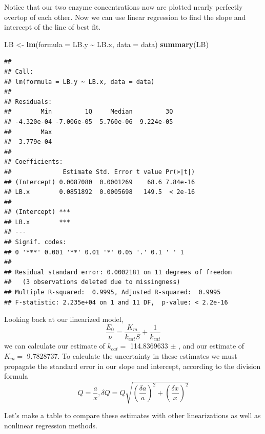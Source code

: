 \documentclass[
]{article}
\newenvironment{Shaded}{\begin{snugshade}}{\end{snugshade}}
\newcommand{\AttributeTok}[1]{\textcolor[rgb]{0.13,0.29,0.53}{#1}}
\newcommand{\FunctionTok}[1]{\textcolor[rgb]{0.13,0.29,0.53}{\textbf{#1}}}
\newcommand{\NormalTok}[1]{#1}
\newcommand{\OtherTok}[1]{\textcolor[rgb]{0.56,0.35,0.01}{#1}}
\newcommand{\SpecialCharTok}[1]{\textcolor[rgb]{0.81,0.36,0.00}{\textbf{#1}}}
\begin{document}
Notice that our two enzyme concentrations now are plotted nearly perfectly overtop of each other. Now we can use linear regression to find the slope and intercept of the line of best fit.

\begin{Shaded}
\begin{Highlighting}[]
\NormalTok{LB }\OtherTok{\textless{}{-}} \FunctionTok{lm}\NormalTok{(}\AttributeTok{formula =}\NormalTok{ LB.y }\SpecialCharTok{\textasciitilde{}}\NormalTok{ LB.x, }\AttributeTok{data =}\NormalTok{ data)}
\FunctionTok{summary}\NormalTok{(LB)}
\end{Highlighting}
\end{Shaded}

\begin{verbatim}
## 
## Call:
## lm(formula = LB.y ~ LB.x, data = data)
## 
## Residuals:
##        Min         1Q     Median         3Q 
## -4.320e-04 -7.006e-05  5.760e-06  9.224e-05 
##        Max 
##  3.779e-04 
## 
## Coefficients:
##              Estimate Std. Error t value Pr(>|t|)
## (Intercept) 0.0087080  0.0001269    68.6 7.84e-16
## LB.x        0.0851892  0.0005698   149.5  < 2e-16
##                
## (Intercept) ***
## LB.x        ***
## ---
## Signif. codes:  
## 0 '***' 0.001 '**' 0.01 '*' 0.05 '.' 0.1 ' ' 1
## 
## Residual standard error: 0.0002181 on 11 degrees of freedom
##   (3 observations deleted due to missingness)
## Multiple R-squared:  0.9995, Adjusted R-squared:  0.9995 
## F-statistic: 2.235e+04 on 1 and 11 DF,  p-value: < 2.2e-16
\end{verbatim}

Looking back at our linearized model,
\[\frac{E_0}{\nu} = \frac{K_m}{k_{cat}S} + \frac{1}{k_{cat}}\]
we can calculate our estimate of \(k_{cat}=\) 114.8369633 \(\pm\) , and our estimate of \(K_m =\) 9.7828737. To calculate the uncertainty in these estimates we must propagate the standard error in our slope and intercept, according to the division formula
\[Q = \frac{a}{x}, \delta Q = Q \sqrt{(\frac{\delta a}{a})^2 + (\frac{\delta x}{x})^2}\]

Let's make a table to compare these estimates with other linearizations as well as nonlinear regression methods.
\end{document}
